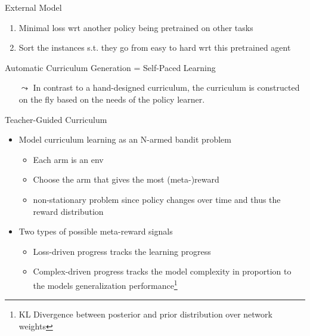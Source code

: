 \begin{frame}[c]{External Model}
	
	\begin{enumerate}
		\item Minimal loss wrt another policy being pretrained on other tasks
		\item Sort the instances s.t. they go from easy to hard wrt this pretrained agent~
	\end{enumerate}
	
\end{frame}
\begin{frame}[c]{Automatic Curriculum Generation = Self-Paced Learning}
	
	\begin{itemize}
		\item[$\leadsto$] In contrast to a hand-designed curriculum, the curriculum is constructed on the fly based on the needs of the policy learner.
	\end{itemize}
	
\end{frame}
\begin{frame}[c]{Teacher-Guided Curriculum }
	
	\begin{itemize}
		\item Model curriculum learning as an N-armed bandit problem
		\begin{itemize}
			\item Each arm is an env 
			\item Choose the arm that gives the most (meta-)reward
			\item non-stationary problem since policy changes over time and thus the reward distribution
		\end{itemize}
		\smallskip
		\item Two types of possible meta-reward signals
		\begin{itemize}
			\item Loss-driven progress tracks the learning progress
			\item Complex-driven progress tracks the model complexity in proportion to the models generalization performance\footnote{KL Divergence between posterior and prior distribution over network weights}
		\end{itemize}
	\end{itemize}
	
\end{frame}
